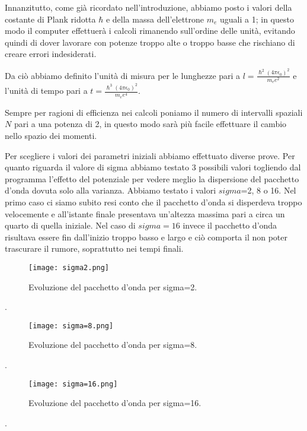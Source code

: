 \documentclass[12pt,onecolumn,a4paper]{memoir}
\begin{document}
Innanzitutto, come già ricordato nell'introduzione, abbiamo posto i valori della costante di Plank ridotta $\hbar$ e della massa dell'elettrone $m_e$ uguali a 1; in questo modo il computer effettuerà i calcoli rimanendo sull'ordine delle unità, evitando quindi di dover lavorare con potenze troppo alte o troppo basse che rischiano di creare errori indesiderati.

Da ciò abbiamo definito l'unità di misura per le lunghezze pari a $l=\frac{\hslash^2(4\pi\epsilon_0)^2}{m_ee^2}$ e l'unità di tempo pari a $t=\frac{\hslash^3(4\pi\epsilon_0)^2}{m_ee^4}$.\newline

Sempre per ragioni di efficienza nei calcoli poniamo il numero di intervalli spaziali $N$ pari a una potenza di 2, in questo modo sarà più facile effettuare il cambio nello spazio dei momenti.\newline

Per scegliere i valori dei parametri iniziali abbiamo effettuato diverse prove.
Per quanto riguarda il valore di sigma abbiamo testato 3 possibili valori togliendo dal programma l'effetto del potenziale per vedere meglio la dispersione del pacchetto d'onda dovuta solo alla varianza.\newline
Abbiamo testato i valori $sigma$=2, 8 o 16. 
Nel primo caso ci siamo subito resi conto che il pacchetto d'onda si disperdeva troppo velocemente e all'istante finale presentava un'altezza massima pari a circa un quarto di quella iniziale. 
Nel caso di $sigma=16$ invece il pacchetto d'onda risultava essere fin dall'inizio troppo basso e largo e ciò comporta il non poter trascurare il rumore, soprattutto nei tempi finali.


 \begin{figure}[htbp] 
\centering 
\texttt{[image: sigma2.png]} 
\caption{Evoluzione del pacchetto d'onda per sigma=2.} 
\end{figure}
.\newline

 \begin{figure}[htbp] 
\centering 
\texttt{[image: sigma=8.png]} 
\caption{Evoluzione del pacchetto d'onda per sigma=8.} 
\end{figure}
.\newline

 \begin{figure}[htbp] 
\centering 
\texttt{[image: sigma=16.png]} 
\caption{Evoluzione del pacchetto d'onda per sigma=16.} 
\end{figure}
.\newline
\end{document}
